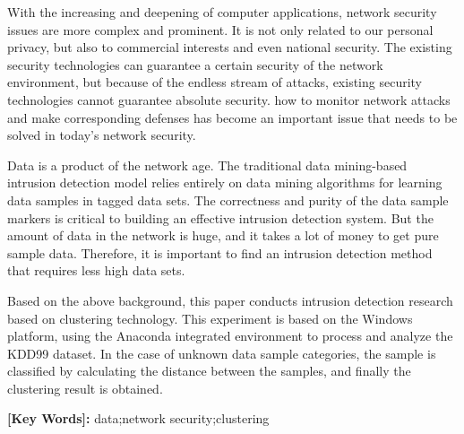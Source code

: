 \newpage
\cfoot{}
\centerline{}
\vspace {12pt}

 With the increasing and deepening of computer applications, network security issues are more complex and prominent. It is not only related to our personal privacy, but also to commercial interests and even national security. The existing security technologies can guarantee a certain security of the network environment, but because of the endless stream of attacks, existing security technologies cannot guarantee absolute security. how to monitor network attacks and make corresponding defenses has become an important issue that needs to be solved in today's network security.
 
 Data is a product of the network age. The traditional data mining-based intrusion detection model relies entirely on data mining algorithms for learning data samples in tagged data sets. The correctness and purity of the data sample markers is critical to building an effective intrusion detection system. But the amount of data in the network is huge, and it takes a lot of money to get pure sample data. Therefore, it is important to find an intrusion detection method that requires less high data sets.
 
 Based on the above background, this paper conducts intrusion detection research based on clustering technology. This experiment is based on the Windows platform, using the Anaconda integrated environment to process and analyze the KDD99 dataset. In the case of unknown data sample categories, the sample is classified by calculating the distance between the samples, and finally the clustering result is obtained.

\vspace {12pt}
\noindent\textbf{[Key Words]:}
data;network security;clustering
